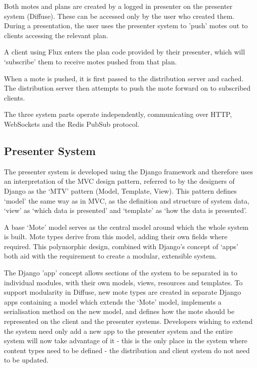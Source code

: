 \documentclass[a4papert,11pt,notitlepage]{ltxdoc}
\begin{document}
Both motes and plans are created by a logged in presenter on the presenter system (Diffuse). These can be accessed only by the user who created them. During a presentation, the user uses the presenter system to 'push' motes out to clients accessing the relevant plan.

A client using Flux enters the plan code provided by their presenter, which will `subscribe' them to receive motes pushed from that plan.

When a mote is pushed, it is first passed to the distribution server and cached. The distribution server then attempts to push the mote forward on to subscribed clients.

The three system parts operate independently, communicating over HTTP, WebSockets and the Redis PubSub protocol.

\subsection{Presenter System}
The presenter system is developed using the Django framework and therefore uses an interpretation of the MVC design pattern, referred to by the designers of Django as the `MTV' pattern (Model, Template, View). This pattern defines `model' the same way as in MVC, as the definition and structure of system data, `view' as `which data is presented' and `template' as `how the data is presented'\cite{djangomvcfaq:web}.

A base `Mote' model serves as the central model around which the whole system is built. Mote types derive from this model, adding their own fields where required. This polymorphic design, combined with Django's concept of `apps' both aid with the requirement to create a modular, extensible system.

The Django 'app' concept allows sections of the system to be separated in to individual modules, with their own models, views, resources and templates. To support modularity in Diffuse, new mote types are created in separate Django apps containing a model which extends the `Mote' model, implements a serialisation method on the new model, and defines how the mote should be represented on the client and the presenter systems. Developers wishing to extend the system need only add a new app to the presenter system and the entire system will now take advantage of it - this is the only place in the system where content types need to be defined - the distribution and client system do not need to be updated. 
\end{document}
